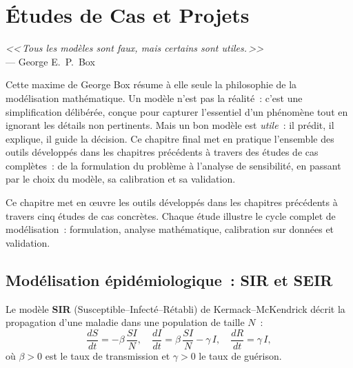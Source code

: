\chapter{\'Etudes de Cas et Projets}
\label{ch:etudes_cas}

\begin{center}
\textit{<<\,Tous les mod\`eles sont faux, mais certains sont utiles.\,>>}\\[4pt]
--- George E.\ P.\ Box
\end{center}

\bigskip

Cette maxime de George Box r\'esume \`a elle seule la philosophie de la mod\'elisation math\'ematique. Un mod\`ele n'est pas la r\'ealit\'e~: c'est une simplification d\'elib\'er\'ee, con\c{c}ue pour capturer l'essentiel d'un ph\'enom\`ene tout en ignorant les d\'etails non pertinents. Mais un bon mod\`ele est \emph{utile}~: il pr\'edit, il explique, il guide la d\'ecision. Ce chapitre final met en pratique l'ensemble des outils d\'evelopp\'es dans les chapitres pr\'ec\'edents \`a travers des \'etudes de cas compl\`etes~: de la formulation du probl\`eme \`a l'analyse de sensibilit\'e, en passant par le choix du mod\`ele, sa calibration et sa validation.

Ce chapitre met en \oe uvre les outils d\'evelopp\'es dans les chapitres
pr\'ec\'edents \`a travers cinq \'etudes de cas concr\`etes. Chaque \'etude
illustre le cycle complet de mod\'elisation~: formulation, analyse
math\'ematique, calibration sur donn\'ees et validation.

\section{Mod\'elisation \'epid\'emiologique~: SIR et SEIR}
\label{sec:sir_seir}

\begin{definition}
Le mod\`ele \textbf{SIR} (Susceptible--Infect\'e--R\'etabli) de
Kermack--McKendrick d\'ecrit la propagation
d'une maladie dans une population de taille $N$~:
\[
  \frac{dS}{dt} = -\beta\, \frac{SI}{N}, \quad
  \frac{dI}{dt} = \beta\, \frac{SI}{N} - \gamma\, I, \quad
  \frac{dR}{dt} = \gamma\, I,
\]
o\`u $\beta > 0$ est le taux de transmission et $\gamma > 0$ le taux
de gu\'erison.
\end{definition}

